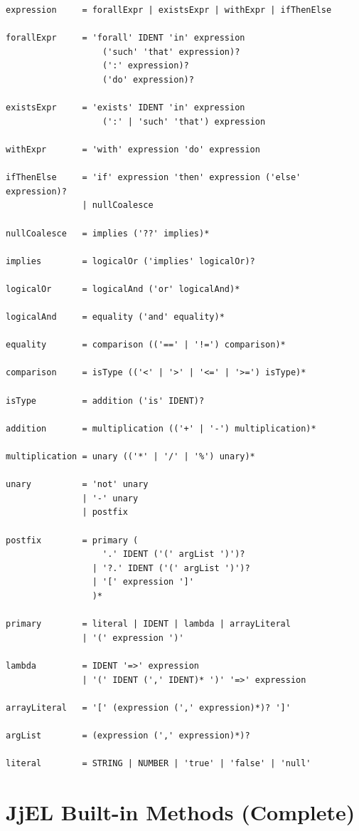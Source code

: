 \documentclass[11pt,a4paper]{article}
\begin{document}
\begin{lstlisting}[style=grammar,caption={JjEL formal grammar in EBNF}]
expression     = forallExpr | existsExpr | withExpr | ifThenElse

forallExpr     = 'forall' IDENT 'in' expression
                   ('such' 'that' expression)?
                   (':' expression)?
                   ('do' expression)?

existsExpr     = 'exists' IDENT 'in' expression
                   (':' | 'such' 'that') expression

withExpr       = 'with' expression 'do' expression

ifThenElse     = 'if' expression 'then' expression ('else' expression)?
               | nullCoalesce

nullCoalesce   = implies ('??' implies)*

implies        = logicalOr ('implies' logicalOr)?

logicalOr      = logicalAnd ('or' logicalAnd)*

logicalAnd     = equality ('and' equality)*

equality       = comparison (('==' | '!=') comparison)*

comparison     = isType (('<' | '>' | '<=' | '>=') isType)*

isType         = addition ('is' IDENT)?

addition       = multiplication (('+' | '-') multiplication)*

multiplication = unary (('*' | '/' | '%') unary)*

unary          = 'not' unary
               | '-' unary
               | postfix

postfix        = primary (
                   '.' IDENT ('(' argList ')')?
                 | '?.' IDENT ('(' argList ')')?
                 | '[' expression ']'
                 )*

primary        = literal | IDENT | lambda | arrayLiteral
               | '(' expression ')'

lambda         = IDENT '=>' expression
               | '(' IDENT (',' IDENT)* ')' '=>' expression

arrayLiteral   = '[' (expression (',' expression)*)? ']'

argList        = (expression (',' expression)*)?

literal        = STRING | NUMBER | 'true' | 'false' | 'null'
\end{lstlisting}


\section{JjEL Built-in Methods (Complete)}\label{app:builtins}
\end{document}
